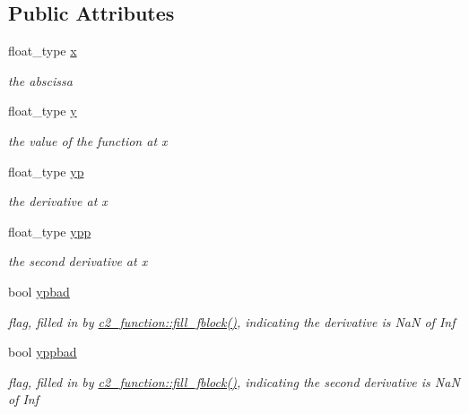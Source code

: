\subsection*{Public Attributes}
\begin{DoxyCompactItemize}
\item 
float\+\_\+type \hyperlink{classc2__fblock_ad5560516bfc794724226af6d3678d518}{x}
\begin{DoxyCompactList}\small\item\em the abscissa \end{DoxyCompactList}\item 
float\+\_\+type \hyperlink{classc2__fblock_a0de289aaf1b624af8cb1461164ea0dfd}{y}
\begin{DoxyCompactList}\small\item\em the value of the function at {\itshape x} \end{DoxyCompactList}\item 
float\+\_\+type \hyperlink{classc2__fblock_a4df4413818bad95cd88e33d29fa7334e}{yp}
\begin{DoxyCompactList}\small\item\em the derivative at {\itshape x} \end{DoxyCompactList}\item 
float\+\_\+type \hyperlink{classc2__fblock_aad33c0adbb2d83549139ab8e9f69c0d3}{ypp}
\begin{DoxyCompactList}\small\item\em the second derivative at {\itshape x} \end{DoxyCompactList}\item 
bool \hyperlink{classc2__fblock_aa75a5d9ec9549d6fa22f6959a101de64}{ypbad}
\begin{DoxyCompactList}\small\item\em flag, filled in by \hyperlink{classc2__function_abdce52d0b89ff5bde13d9390ff8c2ba4}{c2\+\_\+function\+::fill\+\_\+fblock()}, indicating the derivative is NaN of Inf \end{DoxyCompactList}\item 
bool \hyperlink{classc2__fblock_ad07bac2622d2bcfeb7e7892a7db536d3}{yppbad}
\begin{DoxyCompactList}\small\item\em flag, filled in by \hyperlink{classc2__function_abdce52d0b89ff5bde13d9390ff8c2ba4}{c2\+\_\+function\+::fill\+\_\+fblock()}, indicating the second derivative is NaN of Inf \end{DoxyCompactList}\end{DoxyCompactItemize}


